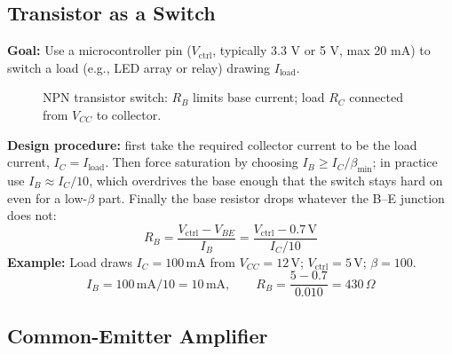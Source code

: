 \subsection{Transistor as a Switch}

\begin{example}
\textbf{Goal:} Use a microcontroller pin ($V_\text{ctrl}$, typically 3.3 V or 5 V, max 20 mA) to switch a load (e.g., LED array or relay) drawing $I_\text{load}$.

\begin{figure}[H]
\begin{center}
\end{center}
\caption{NPN transistor switch: $R_B$ limits base current; load $R_C$ connected from $V_{CC}$ to collector.}
\end{figure}

\textbf{Design procedure:} first take the required collector current to be the load current, $I_C = I_\text{load}$. Then force saturation by choosing $I_B \geq I_C/\beta_\text{min}$; in practice use $I_B \approx I_C/10$, which overdrives the base enough that the switch stays hard on even for a low-$\beta$ part. Finally the base resistor drops whatever the B--E junction does not:
\[
  R_B = \frac{V_\text{ctrl} - V_{BE}}{I_B} = \frac{V_\text{ctrl} - 0.7\,\text{V}}{I_C/10}
\]
\textbf{Example:} Load draws $I_C = 100\,\text{mA}$ from $V_{CC} = 12\,\text{V}$; $V_\text{ctrl} = 5\,\text{V}$; $\beta = 100$.
\[
  I_B = 100\,\text{mA}/10 = 10\,\text{mA}, \qquad
  R_B = \frac{5 - 0.7}{0.010} = 430\,\Omega
\]
\end{example}

\subsection{Common-Emitter Amplifier}

